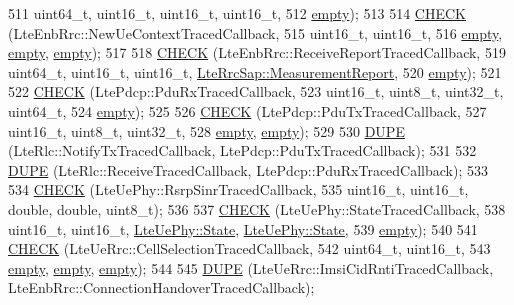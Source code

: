 \begin{DoxyCode}
511          uint64\_t, uint16\_t, uint16\_t, uint16\_t,
512          \hyperlink{classns3_1_1empty}{empty});
513 
514   \hyperlink{traced-callback-typedef-test-suite_8cc_aa79806eee113005f96d9d3cb1480ce98}{CHECK} (LteEnbRrc::NewUeContextTracedCallback,
515          uint16\_t, uint16\_t,
516          \hyperlink{classns3_1_1empty}{empty}, \hyperlink{classns3_1_1empty}{empty}, \hyperlink{classns3_1_1empty}{empty});
517 
518   \hyperlink{traced-callback-typedef-test-suite_8cc_aa79806eee113005f96d9d3cb1480ce98}{CHECK} (LteEnbRrc::ReceiveReportTracedCallback,
519          uint64\_t, uint16\_t, uint16\_t, \hyperlink{structns3_1_1LteRrcSap_1_1MeasurementReport}{LteRrcSap::MeasurementReport},
520          \hyperlink{classns3_1_1empty}{empty});
521 
522   \hyperlink{traced-callback-typedef-test-suite_8cc_aa79806eee113005f96d9d3cb1480ce98}{CHECK} (LtePdcp::PduRxTracedCallback,
523          uint16\_t, uint8\_t, uint32\_t, uint64\_t,
524          \hyperlink{classns3_1_1empty}{empty});
525 
526   \hyperlink{traced-callback-typedef-test-suite_8cc_aa79806eee113005f96d9d3cb1480ce98}{CHECK} (LtePdcp::PduTxTracedCallback,
527          uint16\_t, uint8\_t, uint32\_t,
528          \hyperlink{classns3_1_1empty}{empty}, \hyperlink{classns3_1_1empty}{empty});
529 
530   \hyperlink{traced-callback-typedef-test-suite_8cc_a50f6941ad15ebf54b093e7a2faf9a3f9}{DUPE}  (LteRlc::NotifyTxTracedCallback, LtePdcp::PduTxTracedCallback);
531 
532   \hyperlink{traced-callback-typedef-test-suite_8cc_a50f6941ad15ebf54b093e7a2faf9a3f9}{DUPE}  (LteRlc::ReceiveTracedCallback, LtePdcp::PduRxTracedCallback);
533 
534   \hyperlink{traced-callback-typedef-test-suite_8cc_aa79806eee113005f96d9d3cb1480ce98}{CHECK} (LteUePhy::RsrpSinrTracedCallback,
535          uint16\_t, uint16\_t, \textcolor{keywordtype}{double}, \textcolor{keywordtype}{double}, uint8\_t);
536 
537   \hyperlink{traced-callback-typedef-test-suite_8cc_aa79806eee113005f96d9d3cb1480ce98}{CHECK} (LteUePhy::StateTracedCallback,
538          uint16\_t, uint16\_t, \hyperlink{classns3_1_1LteUePhy_ae5118801f100c494663f0ca1e942aa31}{LteUePhy::State}, \hyperlink{classns3_1_1LteUePhy_ae5118801f100c494663f0ca1e942aa31}{LteUePhy::State},
539          \hyperlink{classns3_1_1empty}{empty});
540 
541   \hyperlink{traced-callback-typedef-test-suite_8cc_aa79806eee113005f96d9d3cb1480ce98}{CHECK} (LteUeRrc::CellSelectionTracedCallback,
542          uint64\_t, uint16\_t,
543          \hyperlink{classns3_1_1empty}{empty}, \hyperlink{classns3_1_1empty}{empty}, \hyperlink{classns3_1_1empty}{empty});
544 
545   \hyperlink{traced-callback-typedef-test-suite_8cc_a50f6941ad15ebf54b093e7a2faf9a3f9}{DUPE}  (LteUeRrc::ImsiCidRntiTracedCallback, LteEnbRrc::ConnectionHandoverTracedCallback);

\end{DoxyCode}
